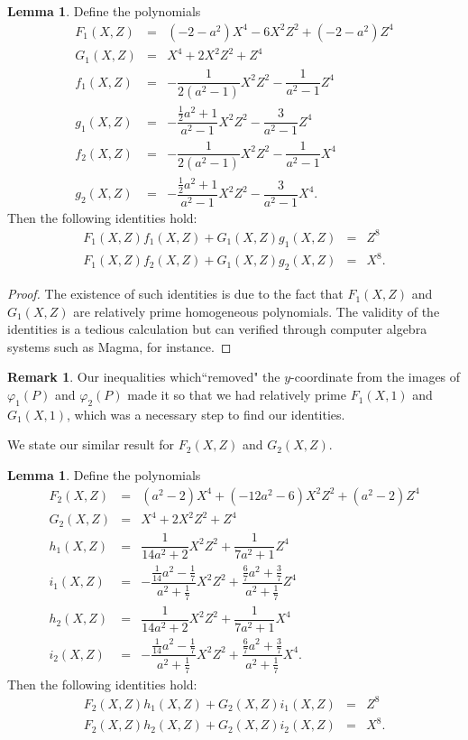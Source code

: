 \documentclass{article}
\theoremstyle{definition}
\newtheorem{lemma}[theorem]{Lemma}
\newtheorem{remark}{Remark}
\begin{document}
\begin{lemma} \label{lemma1}
    Define the polynomials 
    \begin{eqnarray*}
        F_1(X,Z) &=& (-2-a^2)X^4 - 6X^2Z^2 + (-2-a^2)Z^4 \\
        G_1(X,Z) &=& X^4 + 2X^2Z^2 + Z^4 \\
        f_1(X,Z) &=& -\dfrac{1}{2(a^2-1)}X^2Z^2 - \dfrac{1}{a^2 - 1} Z^4 \\
        g_1(X,Z) &=& -\dfrac{\frac{1}{2}a^2 + 1}{a^2-1}X^2Z^2 - \dfrac{3}{a^2-1}Z^4 \\
        f_2(X,Z) &=& - \dfrac{1}{2(a^2-1)}X^2Z^2 - \dfrac{1}{a^2-1}X^4 \\
        g_2(X,Z) &=& -\dfrac{\frac{1}{2}a^2 + 1}{a^2-1}X^2Z^2 - \dfrac{3}{a^2-1}X^4.
    \end{eqnarray*}
    Then the following identities hold:
    \begin{eqnarray*}
        F_1(X,Z)f_1(X,Z) + G_1(X,Z)g_1(X,Z) &=& Z^8 \\
        F_1(X,Z)f_2(X,Z) + G_1(X,Z)g_2(X,Z) &=& X^8.
    \end{eqnarray*}
\end{lemma}
\begin{proof}
    The existence of such identities is due to the fact that $F_1(X,Z)$ and $G_1(X,Z)$ are relatively prime homogeneous polynomials. The validity of the identities is a tedious calculation but can verified through computer algebra systems such as Magma, for instance.
\end{proof}
\begin{remark}
    Our inequalities which``removed" the $y$-coordinate from the images of $\varphi_1(P)$ and $\varphi_2(P)$ made it so that we had relatively prime $F_1(X,1)$ and $G_1(X,1)$, which was a necessary step to find our identities.
\end{remark}
\noindent We state our similar result for $F_2(X,Z)$ and $G_2(X,Z)$.
\begin{lemma} \label{lemma2}
    Define the polynomials 
    \begin{eqnarray*}
        F_2(X,Z) &=& (a^2 - 2)X^4 + (-12a^2 - 6)X^2Z^2 + (a^2 - 2)Z^4 \\
        G_2(X,Z) &=& X^4 + 2X^2Z^2 + Z^4 \\
        h_1(X,Z) &=& \dfrac{1}{14a^2 + 2}X^2Z^2 + \dfrac{1}{7a^2 + 1}Z^4 \\
        i_1(X,Z) &=& -\dfrac{\frac{1}{14}a^2 - \frac{1}{7}}{a^2 + \frac{1}{7}}X^2Z^2 + \dfrac{\frac{6}{7}a^2 + \frac{3}{7}}{a^2 + \frac{1}{7}}Z^4 \\
        h_2(X,Z) &=& \dfrac{1}{14a^2 + 2}X^2Z^2 + \dfrac{1}{7a^2 + 1}X^4 \\
        i_2(X,Z) &=& -\dfrac{\frac{1}{14}a^2 - \frac{1}{7}}{a^2 + \frac{1}{7}}X^2Z^2 + \dfrac{\frac{6}{7}a^2 + \frac{3}{7}}{a^2 + \frac{1}{7}}X^4.
    \end{eqnarray*}
    Then the following identities hold:
    \begin{eqnarray*}
        F_2(X,Z)h_1(X,Z) + G_2(X,Z)i_1(X,Z) &=& Z^8 \\
        F_2(X,Z)h_2(X,Z) + G_2(X,Z)i_2(X,Z) &=& X^8.
    \end{eqnarray*}
\end{lemma}
\end{document}
